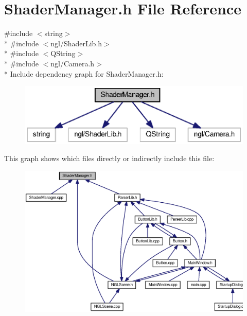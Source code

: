 \section{Shader\-Manager.\-h File Reference}
\label{_shader_manager_8h}
{\ttfamily \#include $<$string$>$}\\*
{\ttfamily \#include $<$ngl/\-Shader\-Lib.\-h$>$}\\*
{\ttfamily \#include $<$Q\-String$>$}\\*
{\ttfamily \#include $<$ngl/\-Camera.\-h$>$}\\*
Include dependency graph for Shader\-Manager.\-h\-:\nopagebreak
\begin{figure}[H]
\begin{center}
\leavevmode
\includegraphics[width=346pt]{_shader_manager_8h__incl}
\end{center}
\end{figure}
This graph shows which files directly or indirectly include this file\-:\nopagebreak
\begin{figure}[H]
\begin{center}
\leavevmode
\includegraphics[width=350pt]{_shader_manager_8h__dep__incl}
\end{center}
\end{figure}
